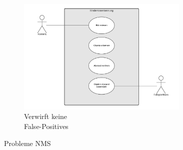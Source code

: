 \begin{figure}[H]
\begin{subfigure}[t]{0.35\textwidth}
		\includegraphics[width=0.9\textwidth]{chapters/cheatsheet/images/UseCaseNeu.png}
		\caption[Verwirft keine False-Positives - Bildquelle: \cite{quickintro}]{Verwirft keine\\ False-Positives \cite{quickintro}}
		\label{fig:rasteryolo1c}
	\end{subfigure}%
	\caption[Problemsituationen NMS - Bildquelle: \cite{quickintro}]{Probleme NMS}
\end{figure}


